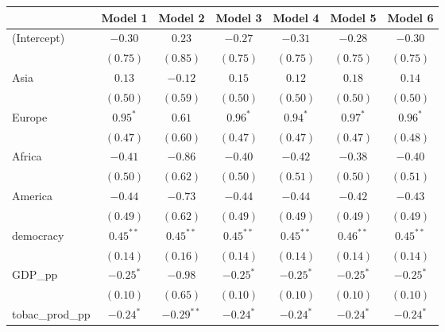 
\begin{table}[!h]
\begin{center}
\begin{tabular}{l c c c c c c }
\toprule
 & Model 1 & Model 2 & Model 3 & Model 4 & Model 5 & Model 6 \\
\midrule
(Intercept)             & $-0.30$      & $0.23$       & $-0.27$      & $-0.31$      & $-0.28$      & $-0.30$      \\
                        & $(0.75)$     & $(0.85)$     & $(0.75)$     & $(0.75)$     & $(0.75)$     & $(0.75)$     \\
Asia                    & $0.13$       & $-0.12$      & $0.15$       & $0.12$       & $0.18$       & $0.14$       \\
                        & $(0.50)$     & $(0.59)$     & $(0.50)$     & $(0.50)$     & $(0.50)$     & $(0.50)$     \\
Europe                  & $0.95^{*}$   & $0.61$       & $0.96^{*}$   & $0.94^{*}$   & $0.97^{*}$   & $0.96^{*}$   \\
                        & $(0.47)$     & $(0.60)$     & $(0.47)$     & $(0.47)$     & $(0.47)$     & $(0.48)$     \\
Africa                  & $-0.41$      & $-0.86$      & $-0.40$      & $-0.42$      & $-0.38$      & $-0.40$      \\
                        & $(0.50)$     & $(0.62)$     & $(0.50)$     & $(0.51)$     & $(0.50)$     & $(0.51)$     \\
America                 & $-0.44$      & $-0.73$      & $-0.44$      & $-0.44$      & $-0.42$      & $-0.43$      \\
                        & $(0.49)$     & $(0.62)$     & $(0.49)$     & $(0.49)$     & $(0.49)$     & $(0.49)$     \\
democracy               & $0.45^{**}$  & $0.45^{**}$  & $0.45^{**}$  & $0.45^{**}$  & $0.46^{**}$  & $0.45^{**}$  \\
                        & $(0.14)$     & $(0.16)$     & $(0.14)$     & $(0.14)$     & $(0.14)$     & $(0.14)$     \\
GDP\_pp                 & $-0.25^{*}$  & $-0.98$      & $-0.25^{*}$  & $-0.25^{*}$  & $-0.25^{*}$  & $-0.25^{*}$  \\
                        & $(0.10)$     & $(0.65)$     & $(0.10)$     & $(0.10)$     & $(0.10)$     & $(0.10)$     \\
tobac\_prod\_pp         & $-0.24^{*}$  & $-0.29^{**}$ & $-0.24^{*}$  & $-0.24^{*}$  & $-0.24^{*}$  & $-0.24^{*}$  \\

\end{tabular}
\end{center}
\end{table}

